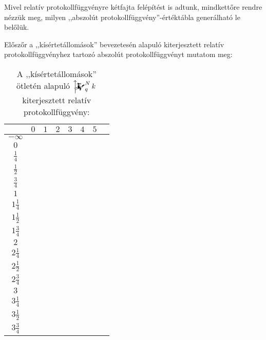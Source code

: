 \documentclass{article}
\newcommand{\blk}{\cellcolor{darkgray}}
\newcommand{\red}{\cellcolor{red!33}}
\newcommand{\grn}{\cellcolor{green!33}}
\newcommand{\ylw}{\cellcolor{yellow}}
\newcommand{\nothing}{\text{\raisebox{0.4em}{\rotatebox{180}{$\curvearrowleft$}}}}%
\newcommand{\just}[1]{\boxed{#1}}%
\newcommand{\incl}{\mathbf{incl}}
\newcommand{\excl}{\mathbf{excl}}
\newcommand{\mainfunext}[3]{\left\uparrow\!\!\!\mathwitch*_{#2}^{#1}#3\right.}
\begin{document}
	\setlength{\extrarowheight}{4px}


	Mivel relatív protokollfüggvényre kétfajta felépítést is adtunk, mindkettőre rendre nézzük meg, milyen ,,abszolút protokollfüggvény''-értéktábla generálható le belőlük.

	Előszőr a ,,kísértetállomások'' bevezetesén alapuló kiterjesztett relatív protokollfüggvényhez tartozó abszolút protokollfüggvényt mutatom meg:

	\begin{table}[H]
		\caption*{A ,,kísértetállomások'' ötletén alapuló $\mainfunext Nqk$ kiterjesztett relatív protokollfüggvény:}
		\centering
		\begin{tabular}{c||c|c|c|c|c|c|c|}
				&	$0$		&	$1$		&	$2$		&	$3$		&	$4$		&	$5$		\\\hline\hline
		$-\infty$	&	\nothing	&	\nothing	&	\nothing	&	\nothing	&	\nothing	&	\nothing	\\\hline
			$0$	&	\nothing	&	\nothing	&	\nothing	&	\nothing	&	\nothing	&	\grn\just\incl	\\\hline
		$\frac14$	&	\ylw\nothing	&	\ylw\nothing	&	\ylw\nothing	&	\ylw\nothing	&	\ylw\nothing	&	\ylw\nothing	\\\hline
		$\frac12$	&	\red\just\excl	&	\nothing	&	\nothing	&	\nothing	&	\nothing	&	\grn\just\incl	\\\hline
		$\frac34$	&	\ylw\nothing	&	\ylw\nothing	&	\ylw\nothing	&	\ylw\nothing	&	\ylw\nothing	&	\ylw\nothing	\\\hline
			$1$	&	\red\just\excl	&	\nothing	&	\nothing	&	\nothing	&	\grn\just\incl	&	\blk		\\\hline
		$1\frac14$	&	\ylw\nothing	&	\ylw\nothing	&	\ylw\nothing	&	\ylw\nothing	&	\ylw\nothing	&	\ylw		\\\hline
		$1\frac12$	&	\blk		&	\red\just\excl	&	\nothing	&	\nothing	&	\grn\just\incl	&	\blk		\\\hline
		$1\frac34$	&	\ylw		&	\ylw\nothing	&	\ylw\nothing	&	\ylw\nothing	&	\ylw\nothing	&	\ylw		\\\hline
			$2$	&	\blk		&	\red\just\excl	&	\nothing	&	\grn\just\incl	&	\blk		&	\blk		\\\hline
		$2\frac14$	&	\ylw		&	\ylw\nothing	&	\ylw\nothing	&	\ylw\nothing	&	\ylw		&	\ylw		\\\hline
		$2\frac12$	&	\blk		&	\blk		&	\red\just\excl	&	\grn\just\incl	&	\blk		&	\blk		\\\hline
		$2\frac34$	&	\ylw		&	\ylw		&	\ylw\nothing	&	\ylw\nothing	&	\ylw		&	\ylw		\\\hline
			$3$	&	\blk		&	\blk		&	\blk		&	\blk		&	\blk		&	\blk		\\\hline
		$3\frac14$	&	\ylw		&	\ylw		&	\ylw		&	\ylw		&	\ylw		&	\ylw		\\\hline
		$3\frac12$	&	\blk		&	\blk		&	\blk		&	\blk		&	\blk		&	\blk		\\\hline
		$3\frac34$	&	\ylw		&	\ylw		&	\ylw		&	\ylw		&	\ylw		&	\ylw		\\\hline
		\end{tabular}
	\end{table}
\end{document}
